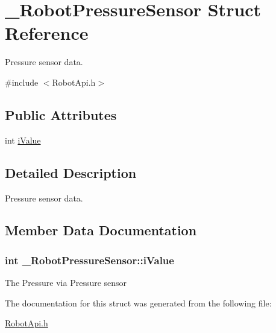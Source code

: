\hypertarget{struct__RobotPressureSensor}{\section{\+\_\+\+Robot\+Pressure\+Sensor Struct Reference}
\label{struct__RobotPressureSensor}
}


Pressure sensor data.  




{\ttfamily \#include $<$Robot\+Api.\+h$>$}

\subsection*{Public Attributes}
\begin{DoxyCompactItemize}
\item 
int \hyperlink{struct__RobotPressureSensor_aa8cde267cdbc78067d0589e15e9fb15d}{i\+Value}
\end{DoxyCompactItemize}


\subsection{Detailed Description}
Pressure sensor data. 

\subsection{Member Data Documentation}
\hypertarget{struct__RobotPressureSensor_aa8cde267cdbc78067d0589e15e9fb15d}{
\subsubsection[{i\+Value}]{\setlength{\rightskip}{0pt plus 5cm}int \+\_\+\+Robot\+Pressure\+Sensor\+::i\+Value}}\label{struct__RobotPressureSensor_aa8cde267cdbc78067d0589e15e9fb15d}
The Pressure via Pressure sensor 

The documentation for this struct was generated from the following file\+:\begin{DoxyCompactItemize}
\item 
\hyperlink{RobotApi_8h}{Robot\+Api.\+h}\end{DoxyCompactItemize}
